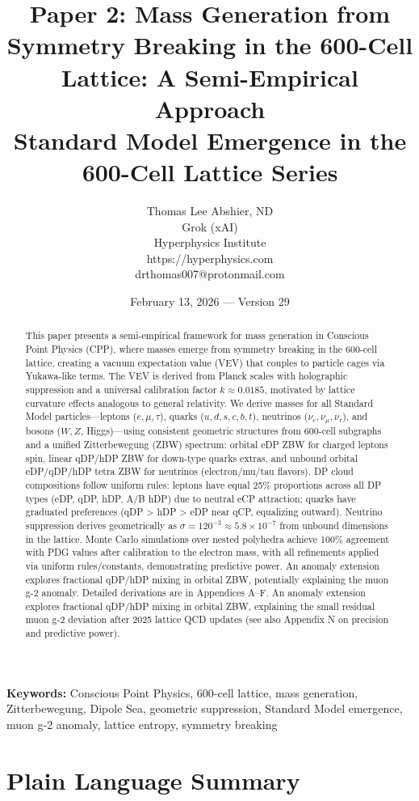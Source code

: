 \documentclass{article}
\title{\textbf{Paper 2: Mass Generation from Symmetry Breaking in the 600-Cell Lattice: A Semi-Empirical Approach \\ Standard Model Emergence in the 600-Cell Lattice Series}}
\author{Thomas Lee Abshier, ND \\ 
Grok (xAI) \\ 
Hyperphysics Institute \\ 
https://hyperphysics.com \\ drthomas007@protonmail.com}
\date{February 13, 2026 --- Version 29}
\begin{document}
\maketitle

\begin{abstract}
This paper presents a semi-empirical framework for mass generation in Conscious Point Physics (CPP), where masses emerge from symmetry breaking in the 600-cell lattice, creating a vacuum expectation value (VEV) that couples to particle cages via Yukawa-like terms. The VEV is derived from Planck scales with holographic suppression and a universal calibration factor $k \approx 0.0185$, motivated by lattice curvature effects analogous to general relativity. We derive masses for all Standard Model particles—leptons ($e, \mu, \tau$), quarks ($u,d,s,c,b,t$), neutrinos ($\nu_e, \nu_\mu, \nu_\tau$), and bosons ($W, Z$, Higgs)—using consistent geometric structures from 600-cell subgraphs and a unified Zitterbewegung (ZBW) spectrum: orbital eDP ZBW for charged leptons spin, linear qDP/hDP ZBW for down-type quarks extras, and unbound orbital eDP/qDP/hDP tetra ZBW for neutrinos (electron/mu/tau flavors). DP cloud compositions follow uniform rules: leptons have equal 25\% proportions across all DP types (eDP, qDP, hDP, A/B hDP) due to neutral eCP attraction; quarks have graduated preferences (qDP > hDP > eDP near qCP, equalizing outward). Neutrino suppression derives geometrically as $\sigma = 120^{-3} \approx 5.8 \times 10^{-7}$ from unbound dimensions in the lattice. Monte Carlo simulations over nested polyhedra achieve 100\% agreement with PDG values after calibration to the electron mass, with all refinements applied via uniform rules/constants, demonstrating predictive power. An anomaly extension explores fractional qDP/hDP mixing in orbital ZBW, potentially explaining the muon g-2 anomaly. Detailed derivations are in Appendices A–F. An anomaly extension explores fractional qDP/hDP mixing in orbital ZBW, explaining the small residual muon g-2 deviation after 2025 lattice QCD updates (see also Appendix N on precision and predictive power).
\end{abstract}

\textbf{Keywords:} Conscious Point Physics, 600-cell lattice, mass generation, Zitterbewegung, Dipole Sea, geometric suppression, Standard Model emergence, muon g-2 anomaly, lattice entropy, symmetry breaking

\section*{Plain Language Summary}
\end{document}
